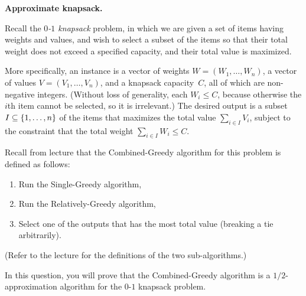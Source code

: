 \documentclass[11pt,addpoints]{exam}
\begin{document}
\begin{questions}
  \begin{solution}
    
  \end{solution}

  \question \textbf{Approximate knapsack.}
  
  Recall the \emph{$0$-$1$ knapsack} problem, in which we are given a set of items having weights and values, and wish to select a subset of the items so that their total weight does not exceed a specified capacity, and their total value is maximized.

  More specifically, an instance is a vector of weights $W=(W_{1}, \ldots, W_{n})$, a vector of values $V=(V_{1},\ldots, V_{n})$, and a knapsack capacity~$C$, all of which are non-negative integers.
  (Without loss of generality, each $W_{i} \leq C$, because otherwise the $i$th item cannot be selected, so it is irrelevant.)
  The desired output is a subset $I \subseteq \{1,\ldots,n\}$ of the items that maximizes the total value $\sum_{i \in I} V_{i}$, subject to the constraint that the total weight $\sum_{i \in I} W_{i} \leq C$.

  Recall from lecture that the Combined-Greedy algorithm for this problem is defined as follows:
  \begin{enumerate}
  \item Run the Single-Greedy algorithm,
  \item Run the Relatively-Greedy algorithm,
  \item Select one of the outputs that has the most total value
    (breaking a tie arbitrarily).
  \end{enumerate}
  (Refer to the lecture for the definitions of the two sub-algorithms.)

  In this question, you will prove that the Combined-Greedy algorithm is a $1/2$-approximation algorithm for the $0$-$1$ knapsack problem.

\end{questions}
\end{document}
